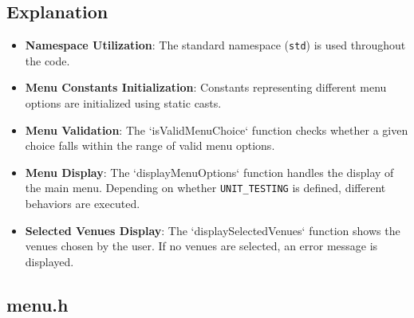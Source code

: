 \documentclass{article}
\begin{document}
	\subsection*{Explanation}
	\begin{itemize}
		\item \textbf{Namespace Utilization}: The standard namespace (\texttt{std}) is used throughout the code.
		\item \textbf{Menu Constants Initialization}: Constants representing different menu options are initialized using static casts.
		\item \textbf{Menu Validation}: The `isValidMenuChoice` function checks whether a given choice falls within the range of valid menu options.
		\item \textbf{Menu Display}: The `displayMenuOptions` function handles the display of the main menu. Depending on whether \texttt{UNIT\_TESTING} is defined, different behaviors are executed.
		\item \textbf{Selected Venues Display}: The `displaySelectedVenues` function shows the venues chosen by the user. If no venues are selected, an error message is displayed.
	\end{itemize}

	\subsection{menu.h}
	
\end{document}
